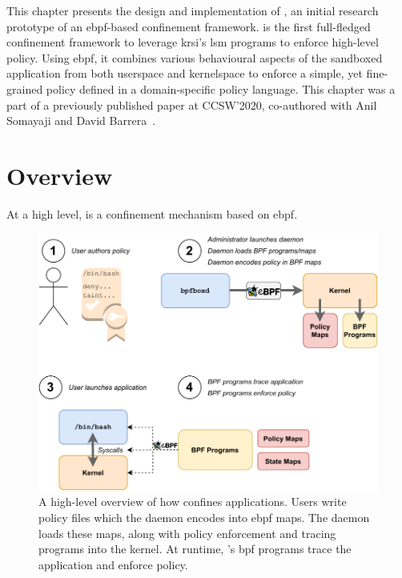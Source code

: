This chapter presents the design and implementation of \bpfbox{}, an initial research
prototype of an \gls{ebpf}-based confinement framework. \bpfbox{} is the first
full-fledged confinement framework to leverage \gls{krsi}'s \gls{lsm} programs to enforce
high-level policy. Using \gls{ebpf}, it combines various behavioural aspects of the
sandboxed application from both userspace and kernelspace to enforce a simple, yet
fine-grained policy defined in a domain-specific policy language. This chapter was a part
of a previously published paper at CCSW'2020, co-authored with Anil Somayaji and David
Barrera~\cite{findlay2020_bpfbox}.



\section{\bpfbox{} Overview}

At a high level, \bpfbox{} is a confinement mechanism based on \gls{ebpf}. 


\begin{figure}[htpb]
  \centering
  \includegraphics[width=0.8\linewidth]{figs/bpfbox/overview.pdf}
  \caption[A high-level overview of how \bpfbox{} confines applications]{
    A high-level overview of how \bpfbox{} confines applications. Users write policy files
    which the daemon encodes into \gls{ebpf} maps. The daemon loads these maps, along with
    policy enforcement and tracing programs into the kernel. At runtime, \bpfbox{}'s
    \gls{bpf} programs trace the application and enforce policy.
  }%
  \label{fig:bpfbox-overview}
\end{figure}

